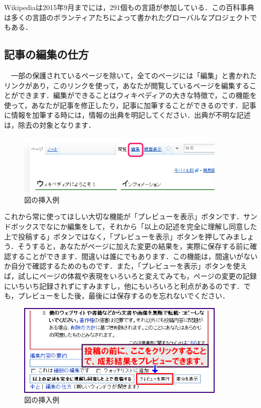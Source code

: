 Wikipediaは2015年9月までには，291個もの言語が参加している．この百科事典は多くの言語のボランティアたちによって書かれたグローバルなプロジェクトでもある．\cite{wikirevo}



\subsection{記事の編集の仕方}

　一部の保護されているページを除いて，全てのページには「編集」と書かれたリンクがあり，このリンクを使って，あなたが閲覧しているページを編集することができます．編集ができることはウィキペディアの大きな特徴で，この機能を使って，あなたが記事を修正したり，記事に加筆することができるのです．記事に情報を加筆する時には，情報の出典を明記してください．出典が不明な記述は，除去の対象となります．\cite{wikiEdit}

\begin{figure}[H]
\centering
\includegraphics[width=10cm]{sample1.png}
\caption{図の挿入例}\label{サンプル図}
\end{figure}

これから常に使ってほしい大切な機能が「プレビューを表示」ボタンです．サンドボックスでなにか編集をして，それから「以上の記述を完全に理解し同意した上で投稿する」ボタンではなく，「プレビューを表示」ボタンを押してみましょう．そうすると，あなたがページに加えた変更の結果を，実際に保存する前に確認することができます．間違いは誰にでもあります．この機能は，間違いがないか自分で確認するためのものです．また，「プレビューを表示」ボタンを使えば，試しにページの体裁や表現をいろいろと変えてみても，ページの変更の記録にいちいち記録されずにすみますし，他にもいろいろと利点があるのです．でも，プレビューをした後，最後には保存するのを忘れないでください．\cite{wikiEdit}

\begin{figure}[htb]
\centering
\includegraphics[width=10cm]{sample2.png}
\caption{図の挿入例}\label{サンプル図}
\end{figure}

